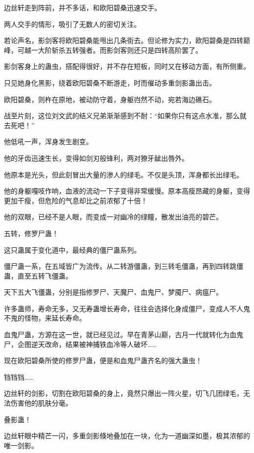 
\begin{this_body}

边丝轩走到阵前，并不多话，和欧阳碧桑迅速交手。

两人交手的情形，吸引了无数人的密切关注。

若论声名，影剑客将欧阳碧桑能甩出几条街去。但论修为实力，欧阳碧桑是四转巅峰，可越一大阶斩杀五转强者。而影剑客则还只是四转高阶罢了。

影剑客身上的蛊虫，搭配得很好，并不存在短板，同时又在移动方面，有所侧重。

只见她身化黑影，绕着欧阳碧桑不断游走，时而催动多重剑影蛊出击。

欧阳碧桑，则杵在原地，被动防守着，身躯岿然不动，宛若海边礁石。

战至片刻，这位刘文武的结义兄弟渐渐感到不耐：“如果你只有这点水准，那么就去死吧！”

他低吼一声，浑身发生剧变。

他的牙齿迅速生长，变得如剑刃般锋利，两对獠牙龇出唇外。

他原本是光头，但此刻冒出大量的渗人的绿毛。不仅是头顶，浑身都长出绿毛。

他的身躯嘎吱作响，血液的流动一下子变得非常缓慢。原本高瘦昂藏的身躯，变得更加干瘦，但危险的气息却比之前浓郁了十倍！

他的双眼，已经不是人眼，而变成一对幽冷的绿瞳，散发出油亮的碧芒。

五转，修罗尸蛊！

这只蛊属于变化道中，最经典的僵尸蛊系列。

僵尸蛊一系，在五域皆广为流传。从二转游僵蛊，到三转毛僵蛊，再到四转跳僵蛊，直至五转飞僵蛊。

天下五大飞僵蛊，分别是指修罗尸、天魔尸、血鬼尸、梦魇尸、病瘟尸。

许多蛊师，寿命无多，又无寿蛊增长寿命，往往会选择化身成僵尸，变成人不人鬼不鬼的怪物，来延长寿命。

血鬼尸蛊，方源在这一世，就已经见过。早在青茅山巅，古月一代就转化为血鬼尸，企图逆天改命，结果被神捕铁血冷等人破坏……

现在欧阳碧桑所使的修罗尸蛊，便是和血鬼尸蛊齐名的强大蛊虫！

铛铛铛……

边丝轩的剑影，切割在欧阳碧桑的身上，竟然只爆出一阵火星，切飞几团绿毛，无法伤害他的肌肤分毫。

叠影蛊！

边丝轩眼中精芒一闪，多重剑影倏地叠加在一块，化为一道幽深如墨，极其浓郁的唯一剑影。


\end{this_body}
